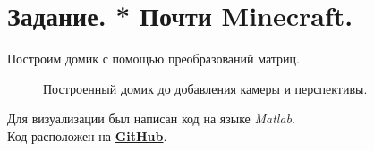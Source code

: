 \documentclass[a5paper, 10pt]{article}
\theoremstyle{definition}
\theoremstyle{plain}
\theoremstyle{remark}
\begin{document}
\newpage
\section{Задание. * Почти Minecraft.}

Построим домик с помощью преобразований матриц.
\begin{figure}[h!]
\caption{Построенный домик до добавления камеры и перспективы.}
\end{figure}





Для визуализации был написан код на языке \textit{Matlab}. \\
Код расположен на \href{https://github.com/a-nechaeva/practical_Linal/tree/main/lab2/py_code}{\textbf{GitHub}}.
\end{document}
